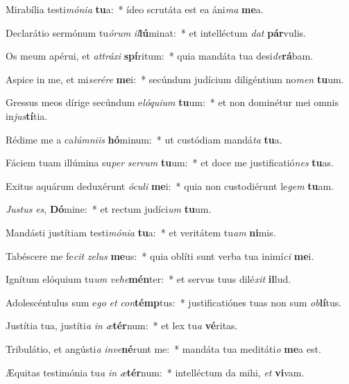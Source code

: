 \item Mirabília testi\textit{mó}\textit{ni}\textit{a} \textbf{tu}a:~* ídeo scrutáta est ea áni\textit{ma} \textbf{me}a.
\item Declarátio sermónum tu\textit{ó}\textit{rum} \textit{il}\textbf{lú}minat:~* et intelléctum \textit{dat} \textbf{pár}vulis.
\item Os meum apérui, et \textit{at}\textit{trá}\textit{xi} \textbf{spí}ritum:~* quia mandáta tua desi\textit{de}\textbf{rá}bam.
\item Aspice in me, et mi\textit{se}\textit{ré}\textit{re} \textbf{me}i:~* secúndum judícium diligéntium no\textit{men} \textbf{tu}um.
\item Gressus meos dírige secúndum e\textit{ló}\textit{qui}\textit{um} \textbf{tu}um:~* et non dominétur mei omnis in\textit{jus}\textbf{tí}tia.
\item Rédime me a ca\textit{lúm}\textit{ni}\textit{is} \textbf{hó}minum:~* ut custódiam mandá\textit{ta} \textbf{tu}a.
\item Fáciem tuam illúmina su\textit{per} \textit{ser}\textit{vum} \textbf{tu}um:~* et doce me justificatió\textit{nes} \textbf{tu}as.
\item Exitus aquárum deduxérunt \textit{ó}\textit{cu}\textit{li} \textbf{me}i:~* quia non custodiérunt le\textit{gem} \textbf{tu}am.
\item \textit{Jus}\textit{tus} \textit{es}, \textbf{Dó}mine:~* et rectum judíci\textit{um} \textbf{tu}um.
\item Mandásti justítiam testi\textit{mó}\textit{ni}\textit{a} \textbf{tu}a:~* et veritátem tu\textit{am} \textbf{ni}mis.
\item Tabéscere me fe\textit{cit} \textit{ze}\textit{lus} \textbf{me}us:~* quia oblíti sunt verba tua inimí\textit{ci} \textbf{me}i.
\item Ignítum elóquium tu\textit{um} \textit{ve}\textit{he}\textbf{mén}ter:~* et servus tuus dilé\textit{xit} \textbf{il}lud.
\item Adolescéntulus sum e\textit{go} \textit{et} \textit{con}\textbf{témp}tus:~* justificatiónes tuas non sum \textit{ob}\textbf{lí}tus.
\item Justítia tua, justíti\textit{a} \textit{in} \textit{æ}\textbf{tér}num:~* et lex tu\textit{a} \textbf{vé}ritas.
\item Tribulátio, et angústi\textit{a} \textit{in}\textit{ve}\textbf{né}runt me:~* mandáta tua meditáti\textit{o} \textbf{me}a est.
\item Æquitas testimónia tu\textit{a} \textit{in} \textit{æ}\textbf{tér}num:~* intelléctum da mihi, \textit{et} \textbf{vi}vam.
